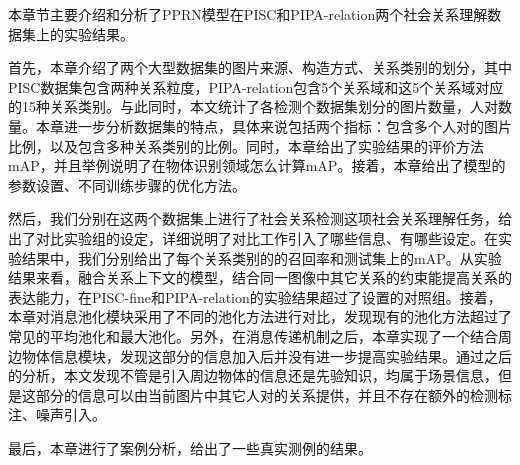 本章节主要介绍和分析了PPRN模型在PISC和PIPA-relation两个社会关系理解数据集上的实验结果。

首先，本章介绍了两个大型数据集的图片来源、构造方式、关系类别的划分，其中PISC数据集包含两种关系粒度，PIPA-relation包含5个关系域和这5个关系域对应的15种关系类别。与此同时，本文统计了各检测个数据集划分的图片数量，人对数量。本章进一步分析数据集的特点，具体来说包括两个指标：包含多个人对的图片比例，以及包含多种关系类别的比例。同时，本章给出了实验结果的评价方法mAP，并且举例说明了在物体识别领域怎么计算mAP。接着，本章给出了模型的参数设置、不同训练步骤的优化方法。

然后，我们分别在这两个数据集上进行了社会关系检测这项社会关系理解任务，给出了对比实验组的设定，详细说明了对比工作引入了哪些信息、有哪些设定。在实验结果中，我们分别给出了每个关系类别的的召回率和测试集上的mAP。从实验结果来看，融合关系上下文的模型，结合同一图像中其它关系的约束能提高关系的表达能力，在PISC-fine和PIPA-relation的实验结果超过了设置的对照组。接着，本章对消息池化模块采用了不同的池化方法进行对比，发现现有的池化方法超过了常见的平均池化和最大池化。另外，在消息传递机制之后，本章实现了一个结合周边物体信息模块，发现这部分的信息加入后并没有进一步提高实验结果。通过之后的分析，本文发现不管是引入周边物体的信息还是先验知识，均属于场景信息，但是这部分的信息可以由当前图片中其它人对的关系提供，并且不存在额外的检测标注、噪声引入。

最后，本章进行了案例分析，给出了一些真实测例的结果。


